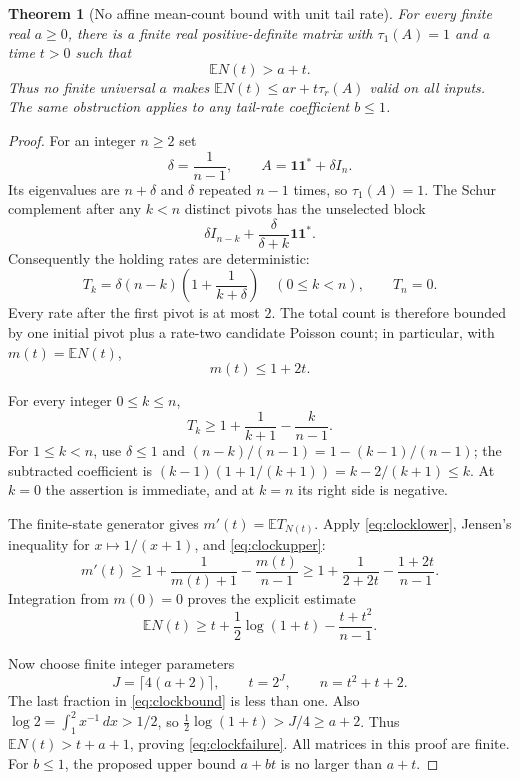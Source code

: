 \documentclass[11pt]{article}
\newtheorem{theorem}{Theorem}[section]
\theoremstyle{remark}\newtheorem{remark}[theorem]{Remark}
\newcommand{\E}{\mathbb E}
\begin{document}
\begin{theorem}[No affine mean-count bound with unit tail rate]\label{thm:clock}
For every finite real $a\ge0$, there is a finite real positive-definite matrix with $\tau_1(A)=1$ and a time $t>0$ such that
\begin{equation}
 \E N(t)>a+t. \label{eq:clockfailure}
\end{equation}
Thus no finite universal $a$ makes $\E N(t)\le ar+t\tau_r(A)$ valid on all inputs. The same obstruction applies to any tail-rate coefficient $b\le1$.
\end{theorem}
\begin{proof}
For an integer $n\ge2$ set
\begin{equation}
 \delta=\frac1{n-1},\qquad A=\mathbf1\mathbf1^*+\delta I_n.
 \label{eq:clockmatrix}
\end{equation}
Its eigenvalues are $n+\delta$ and $\delta$ repeated $n-1$ times, so $\tau_1(A)=1$. The Schur complement after any $k<n$ distinct pivots has the unselected block
\[
 \delta I_{n-k}+\frac{\delta}{\delta+k}\mathbf1\mathbf1^*.
\]
Consequently the holding rates are deterministic:
\begin{equation}
 T_k=\delta(n-k)\left(1+\frac1{k+\delta}\right)\quad(0\le k<n),
 \qquad T_n=0. \label{eq:spikerate}
\end{equation}
Every rate after the first pivot is at most $2$. The total count is therefore bounded by one initial pivot plus a rate-two candidate Poisson count; in particular, with $m(t)=\E N(t)$,
\begin{equation}
 m(t)\le1+2t. \label{eq:clockupper}
\end{equation}

For every integer $0\le k\le n$,
\begin{equation}
 T_k\ge1+\frac1{k+1}-\frac{k}{n-1}. \label{eq:clocklower}
\end{equation}
For $1\le k<n$, use $\delta\le1$ and $(n-k)/(n-1)=1-(k-1)/(n-1)$; the subtracted coefficient is
$(k-1)(1+1/(k+1))=k-2/(k+1)\le k$. At $k=0$ the assertion is immediate, and at $k=n$ its right side is negative.

The finite-state generator gives $m'(t)=\E T_{N(t)}$. Apply \eqref{eq:clocklower}, Jensen's inequality for $x\mapsto1/(x+1)$, and \eqref{eq:clockupper}:
\[
 m'(t)\ge1+\frac1{m(t)+1}-\frac{m(t)}{n-1}
 \ge1+\frac1{2+2t}-\frac{1+2t}{n-1}.
\]
Integration from $m(0)=0$ proves the explicit estimate
\begin{equation}
 \boxed{\displaystyle
 \E N(t)\ge t+\frac12\log(1+t)-\frac{t+t^2}{n-1}.}
 \label{eq:clockbound}
\end{equation}

Now choose finite integer parameters
\begin{equation}
 J=\lceil4(a+2)\rceil,\qquad t=2^J,\qquad n=t^2+t+2. \label{eq:clockparams}
\end{equation}
The last fraction in \eqref{eq:clockbound} is less than one. Also
$\log2=\int_1^2x^{-1}\,dx>1/2$, so
$\frac12\log(1+t)>J/4\ge a+2$. Thus $\E N(t)>t+a+1$, proving \eqref{eq:clockfailure}. All matrices in this proof are finite. For $b\le1$, the proposed upper bound $a+bt$ is no larger than $a+t$.
\end{proof}
\end{document}
